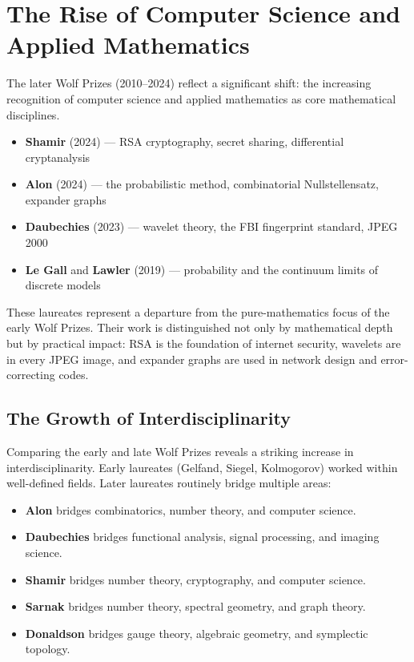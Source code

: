 \section{The Rise of Computer Science and Applied Mathematics}

The later Wolf Prizes (2010--2024) reflect a significant shift: the increasing recognition of computer science and applied mathematics as core mathematical disciplines.

\begin{itemize}
    \item \textbf{Shamir} (2024) --- RSA cryptography, secret sharing, differential cryptanalysis
    \item \textbf{Alon} (2024) --- the probabilistic method, combinatorial Nullstellensatz, expander graphs
    \item \textbf{Daubechies} (2023) --- wavelet theory, the FBI fingerprint standard, JPEG 2000
    \item \textbf{Le Gall} and \textbf{Lawler} (2019) --- probability and the continuum limits of discrete models
\end{itemize}

These laureates represent a departure from the pure-mathematics focus of the early Wolf Prizes. Their work is distinguished not only by mathematical depth but by practical impact: RSA is the foundation of internet security, wavelets are in every JPEG image, and expander graphs are used in network design and error-correcting codes.

\subsection{The Growth of Interdisciplinarity}

Comparing the early and late Wolf Prizes reveals a striking increase in interdisciplinarity. Early laureates (Gelfand, Siegel, Kolmogorov) worked within well-defined fields. Later laureates routinely bridge multiple areas:

\begin{itemize}
    \item \textbf{Alon} bridges combinatorics, number theory, and computer science.
    \item \textbf{Daubechies} bridges functional analysis, signal processing, and imaging science.
    \item \textbf{Shamir} bridges number theory, cryptography, and computer science.
    \item \textbf{Sarnak} bridges number theory, spectral geometry, and graph theory.
    \item \textbf{Donaldson} bridges gauge theory, algebraic geometry, and symplectic topology.
\end{itemize}

